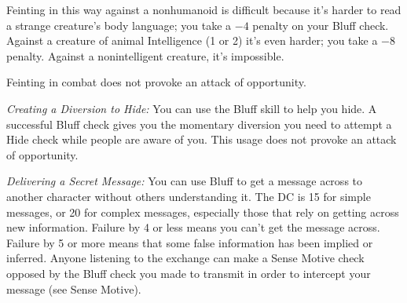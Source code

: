 Feinting in this way against a nonhumanoid is difficult because it's harder to read a strange creature's body language; you take a $-4$ penalty on your Bluff check. Against a creature of animal Intelligence (1 or 2) it's even harder; you take a $-8$ penalty. Against a nonintelligent creature, it's impossible.

Feinting in combat does not provoke an attack of opportunity.

\textit{Creating a Diversion to Hide:} You can use the Bluff skill to help you hide. A successful Bluff check gives you the momentary diversion you need to attempt a Hide check while people are aware of you. This usage does not provoke an attack of opportunity.

\textit{Delivering a Secret Message:} You can use Bluff to get a message across to another character without others understanding it. The DC is 15 for simple messages, or 20 for complex messages, especially those that rely on getting across new information. Failure by 4 or less means you can't get the message across. Failure by 5 or more means that some false information has been implied or inferred. Anyone listening to the exchange can make a Sense Motive check opposed by the Bluff check you made to transmit in order to intercept your message (see Sense Motive).





